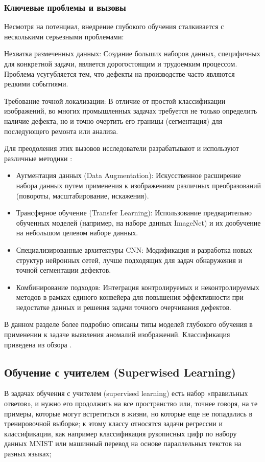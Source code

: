 \documentclass[14pt,a4paper]{article}
\begin{document}
\subsubsection*{Ключевые проблемы и вызовы}

Несмотря на потенциал, внедрение глубокого обучения сталкивается с несколькими серьезными проблемами:

Нехватка размеченных данных: Создание больших наборов данных, специфичных для конкретной задачи, является дорогостоящим и трудоемким процессом. Проблема усугубляется тем, что дефекты на производстве часто являются редкими событиями.

Требование точной локализации: В отличие от простой классификации изображений, во многих промышленных задачах требуется не только определить наличие дефекта, но и точно очертить его границы (сегментация) для последующего ремонта или анализа.

Для преодоления этих вызовов исследователи разрабатывают и используют различные методики \cite{Bhatt2021}:
\begin{itemize}
	\item Аугментация данных (Data Augmentation): Искусственное расширение набора данных путем применения к изображениям различных преобразований (повороты, масштабирование, искажения).
	\item Трансферное обучение (Transfer Learning): Использование предварительно обученных моделей (например, на наборе данных ImageNet) и их дообучение на небольшом целевом наборе данных.
	\item Специализированные архитектуры CNN: Модификация и разработка новых структур нейронных сетей, лучше подходящих для задач обнаружения и точной сегментации дефектов.
	\item Комбинирование подходов: Интеграция контролируемых и неконтролируемых методов в рамках единого конвейера для повышения эффективности при недостатке данных и решения задачи точного очерчивания дефектов.
\end{itemize}

 В данном разделе более подробно описаны типы моделей глубокого обучения в применении к задаче выявления аномалий изображений. Классификация приведена из обзора \cite{Bhatt2021}.

\subsection{Обучение с учителем (Superwised Learning)} 
В задачах обучения с учителем (supervised learning) есть набор «правильных ответов», и нужно его продолжить на все пространство или, точнее говоря, на те примеры, которые могут встретиться в жизни, но которые еще не попадались в тренировочной выборке; к этому классу относятся задачи регрессии и классификации, как например классификация рукописных цифр по набору данных MNIST или машинный перевод на основе параллельных текстов на разных языках; \cite{Nikolenko2018}
\end{document}
